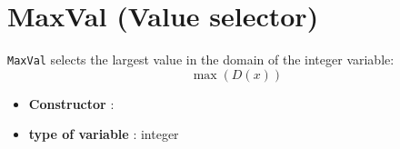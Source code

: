 \section{MaxVal (Value selector)}\label{maxval:maxvalvalselector}\hypertarget{maxval:maxvalvalselector}{}
\begin{notedef}
  \texttt{MaxVal} selects the largest value in the domain of the integer variable:
$$\max(D(x))$$
\end{notedef}

\begin{itemize}
	\item \textbf{Constructor} : 
	\item \textbf{type of variable} : integer
\end{itemize}

%

